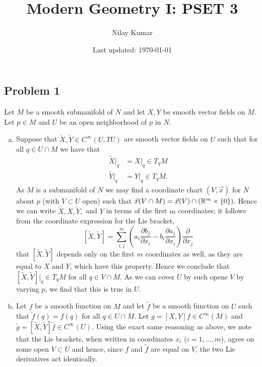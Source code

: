 \documentclass{../mathnotes}
\title{Modern Geometry I: PSET 3}
\author{Nilay Kumar}
\date{Last updated: \today}
\begin{document}
\maketitle

\subsection*{Problem 1}
Let $M$ be a smooth submanifold of $N$ and let $X,Y$ be smooth vector fields
on $M$. Let $p\in M$ and $U$ be an open neighborhood of $p$ in $N$.
\begin{enumerate}[(a)]
    \item Suppose that $\tilde X,\tilde Y\in C^\infty(U,TU)$ are smooth vector fields
        on $U$ such that for all $q\in U\cap M$ we have that
        \begin{align*}
            \tilde X|_q &= X|_q\in T_qM\\
            \tilde Y|_q &= Y|_q\in T_qM.
        \end{align*}
        As $M$ is a submanifold of $N$ we may find a coordinate chart $(V,\vec x)$
        for $N$ about $p$ (with $V\subset U$ open) such that $\vec x(V\cap M)=\vec x(V)\cap(\mathbb{R}^m\times\{0\})$.
        Hence we can write $\tilde X,X,\tilde Y,$ and $Y$ in terms of the first $m$
        coordinates; it follows from the coordinate expression for the Lie bracket,
        \[ [\tilde X,\tilde Y] = \sum_{i,j}^m\left( a_i\frac{\partial b_j}{\partial x_i}-b_i\frac{\partial a_j}{\partial x_i} \right)\frac{\partial}{\partial x_j}\]
        that $[\tilde X,\tilde Y]$ depends only on the first $m$ coordinates as well, as they
        are equal to $X$ and $Y$, which have this property. Hence we conclude that
        $[\tilde X,\tilde Y]|_q\in T_qM$ for all $q\in V\cap M$. As we can cover $U$ by such
        opens $V$ by varying $p$, we find that this is true in $U$.
    \item Let $f$ be a smooth function on $M$ and let $\tilde f$ be a smooth function
        on $U$ such that $\tilde f(q)=f(q)$ for all $q\in U\cap M$. Let $g=[X,Y]f\in C^\infty(M)$
        and $\tilde g=[\tilde X,\tilde Y]\tilde f\in C^\infty(U).$ Using the exact same reasoning
        as above, we note that the Lie brackets, when written in coordinates $x_i$ ($i=1,\ldots, m$),
        agree on some open $V\subset U$ and hence, since $f$ and $\tilde f$ are equal on $V$,
        the two Lie derivatives act identically.
\end{enumerate}
\end{document}
